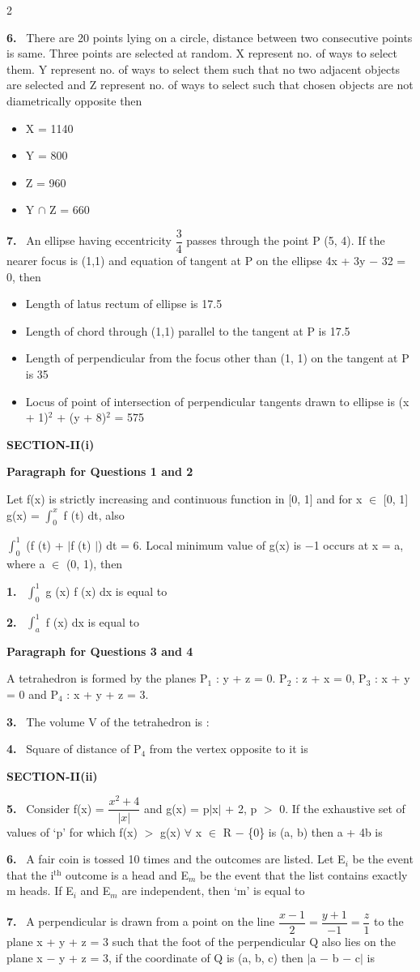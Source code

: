 \documentclass[10pt]{extarticle}
\newcommand{\sect}[1]{\par\smallskip\noindent\textbf{#1}\par}
\newcommand{\qn}[1]{\par\smallskip\noindent\textbf{#1.}~}
\newcommand{\paraq}[2]{\par\smallskip\noindent\textbf{Paragraph for Questions #1 and #2}\par}
\newenvironment{qoptions}{\begin{itemize}[leftmargin=1.8em,itemsep=1pt,topsep=2pt,label={}]}{\end{itemize}}
\newcommand{\opt}[2]{\item[(#1)] #2}
\begin{document}
\begin{multicols}{2}
\qn{6} There are 20 points lying on a circle, distance between two consecutive points is same. Three points are selected at random. X represent no. of ways to select them. Y represent no. of ways to select them such that no two adjacent objects are selected and Z represent no. of ways to select such that chosen objects are not diametrically opposite then
\begin{qoptions}
\opt{A}{X = 1140}
\opt{B}{Y = 800}
\opt{C}{Z = 960}
\opt{D}{Y $\cap$ Z = 660}
\end{qoptions}
\qn{7} An ellipse having eccentricity $\dfrac34$ passes through the point P (5, 4). If the nearer focus is (1,1) and equation of tangent at P on the ellipse 4x + 3y $-$ 32 = 0, then
\begin{qoptions}
\opt{A}{Length of latus rectum of ellipse is 17.5}
\opt{B}{Length of chord through (1,1) parallel to the tangent at P is 17.5}
\opt{C}{Length of perpendicular from the focus other than (1, 1) on the tangent at P is 35}
\opt{D}{Locus of point of intersection of perpendicular tangents drawn to ellipse is (x + 1)$^2$ + (y + 8)$^2$ = 575}
\end{qoptions}
\sect{SECTION-II(i)}
\paraq{1}{2}
Let f(x) is strictly increasing and continuous function in [0, 1] and for x $\in$ [0, 1] g(x) = $\displaystyle\int_0^x$ f (t) dt, also\par
$\displaystyle\int_0^1$ (f (t) + $|$f (t) $|$) dt = 6. Local minimum value of g(x) is $-$1 occurs at x = a, where a $\in$ (0, 1), then
\qn{1} $\displaystyle\int_0^1$ g (x) f (x) dx is equal to
\qn{2} $\displaystyle\int_a^1$ f (x) dx is equal to
\paraq{3}{4}
A tetrahedron is formed by the planes P$_1$ : y + z = 0. P$_2$ : z + x = 0, P$_3$ : x + y = 0 and P$_4$ : x + y + z = 3.
\qn{3} The volume V of the tetrahedron is :
\qn{4} Square of distance of P$_4$ from the vertex opposite to it is
\sect{SECTION-II(ii)}
\qn{5} Consider f(x) = $\dfrac{x^2+4}{|x|}$ and g(x) = p$|$x$|$ + 2, p $>$ 0. If the exhaustive set of values of `p' for which f(x) $>$ g(x) $\forall$ x $\in$ R $-$ \{0\} is (a, b) then a + 4b is
\qn{6} A fair coin is tossed 10 times and the outcomes are listed. Let E$_i$ be the event that the i$^{\mathrm{th}}$ outcome is a head and E$_m$ be the event that the list contains exactly m heads. If E$_i$ and E$_m$ are independent, then `m' is equal to
\qn{7} A perpendicular is drawn from a point on the line $\dfrac{x-1}2=\dfrac{y+1}{-1}=\dfrac z1$ to the plane x + y + z = 3 such that the foot of the perpendicular Q also lies on the plane x $-$ y + z = 3, if the coordinate of Q is (a, b, c) then $|$a $-$ b $-$ c$|$ is

\end{multicols}
\end{document}
